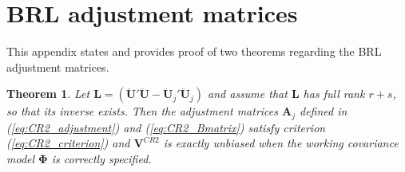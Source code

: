 \documentclass[12pt]{article}
\newtheorem{thm}{Theorem}
\newcommand{\bm}{\mathbf}
\newcommand{\bs}{\boldsymbol}
\begin{document}

\appendix

\section{BRL adjustment matrices}
\label{app:theorems}

This appendix states and provides proof of two theorems regarding the BRL adjustment matrices. 

\begin{thm}
\label{thm:BRL_FE}
Let $\bm{L} = \left(\bm{\ddot{U}}'\bm{\ddot{U}} - \bm{\ddot{U}}_j'\bm{\ddot{U}}_j\right)$ and assume that $\bm{L}$ has full rank $r + s$, so that its inverse exists. Then the adjustment matrices $\bm{A}_j$ defined in (\ref{eq:CR2_adjustment}) and (\ref{eq:CR2_Bmatrix}) satisfy criterion (\ref{eq:CR2_criterion}) and $\bm{V}^{CR2}$ is exactly unbiased when the working covariance model $\bs\Phi$ is correctly specified.
\end{thm}
\end{document}
